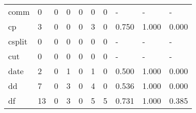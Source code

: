 \begin{longtable}{lp{2.0cm}p{2.0cm}p{2.0cm}p{2.0cm}p{2.0cm}p{2.0cm}p{2.0cm}p{2.0cm}p{2.0cm}}
comm      &                      0 &                                             0 &                                            0 &                                           0 &                                            0 &                                          0 &                                    - &                                      - &                                    - \\
cp        &                      3 &                                             0 &                                            0 &                                           0 &                                            3 &                                          0 &                                0.750 &                                  1.000 &                                0.000 \\
csplit    &                      0 &                                             0 &                                            0 &                                           0 &                                            0 &                                          0 &                                    - &                                      - &                                    - \\
cut       &                      0 &                                             0 &                                            0 &                                           0 &                                            0 &                                          0 &                                    - &                                      - &                                    - \\
date      &                      2 &                                             0 &                                            1 &                                           0 &                                            1 &                                          0 &                                0.500 &                                  1.000 &                                0.000 \\
dd        &                      7 &                                             0 &                                            3 &                                           0 &                                            4 &                                          0 &                                0.536 &                                  1.000 &                                0.000 \\
df        &                     13 &                                             0 &                                            3 &                                           0 &                                            5 &                                          5 &                                0.731 &                                  1.000 &                                0.385 \\

\end{longtable}
